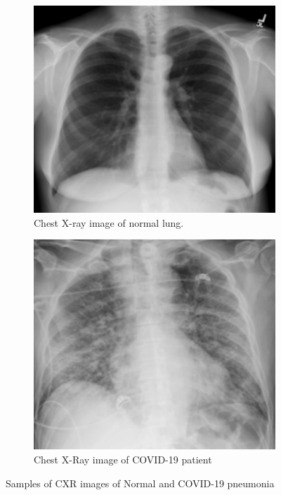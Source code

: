 \begin{figure}%
    \centering
    \begin{subfigure}[b]{0.4\textwidth}
        \centering
        \includegraphics[width=\textwidth]{Figures/introNormCXR.png}
        \caption{Chest X-ray image of normal lung.}
        \label{NorCXR}
    \end{subfigure}
     \begin{subfigure}[b]{0.4\textwidth}
         \centering
         \includegraphics[width=\textwidth]{Figures/intoCovidCXR.png}
         \caption{Chest X-Ray image of COVID-19 patient}
         \label{CovCXR}
     \end{subfigure}
    \caption{Samples of CXR images of Normal and COVID-19 pneumonia}%
    \label{NorCovCXR}%
\end{figure}

